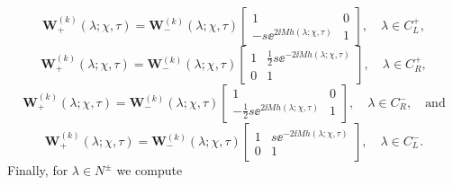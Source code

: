 \begin{equation}
\mathbf{W}^{(k)}_+(\lambda;\chi,\tau)=\mathbf{W}^{(k)}_-(\lambda;\chi,\tau)\begin{bmatrix}1 & 0\\
-s\ee^{2\ii Mh(\lambda;\chi,\tau)} & 1\end{bmatrix},\quad\lambda\in C_L^+,
\label{eq:Wjump-exterior-CLplus}
\end{equation}
\begin{equation}
\mathbf{W}^{(k)}_+(\lambda;\chi,\tau)=\mathbf{W}^{(k)}_-(\lambda;\chi,\tau)\begin{bmatrix}1 & \tfrac{1}{2}s\ee^{-2\ii Mh(\lambda;\chi,\tau)} \\ 0 & 1\end{bmatrix},\quad\lambda\in C_R^+,
\end{equation}
\begin{equation}
\mathbf{W}^{(k)}_+(\lambda;\chi,\tau)=\mathbf{W}^{(k)}_-(\lambda;\chi,\tau)\begin{bmatrix}1 & 0\\
-\tfrac{1}{2}s\ee^{2\ii Mh(\lambda;\chi,\tau)} & 1\end{bmatrix},\quad
\lambda\in C_R^-,\quad\text{and}
\end{equation}
\begin{equation}
\mathbf{W}^{(k)}_+(\lambda;\chi,\tau)=\mathbf{W}^{(k)}_-(\lambda;\chi,\tau)\begin{bmatrix} 1 & s\ee^{-2\ii Mh(\lambda;\chi,\tau)}\\ 0 & 1\end{bmatrix},\quad\lambda\in C_L^-.
\label{eq:Wjump-exterior-CLminus}
\end{equation}
Finally, for $\lambda\in N^\pm$ we compute 
